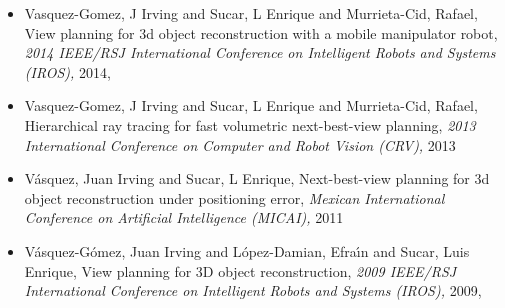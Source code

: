 \begin{itemize}
\item Vasquez-Gomez, J Irving and Sucar, L Enrique and Murrieta-Cid, Rafael, View planning for 3d object reconstruction with a mobile manipulator robot, \textit{ 2014 IEEE/RSJ International Conference on Intelligent Robots and Systems (IROS),} 2014, \href{https://doi.org/10.1109/IROS.2014.6943158} {\faFilePdfO} 
\item Vasquez-Gomez, J Irving and Sucar, L Enrique and Murrieta-Cid, Rafael, Hierarchical ray tracing for fast volumetric next-best-view planning, \textit{ 2013 International Conference on Computer and Robot Vision (CRV),} 2013 
\item V{\'a}squez, Juan Irving and Sucar, L Enrique, Next-best-view planning for 3d object reconstruction under positioning error, \textit{ Mexican International Conference on Artificial Intelligence (MICAI),} 2011 
\item V{\'a}squez-G{\'o}mez, Juan Irving and L{\'o}pez-Damian, Efra{\'\i}n and Sucar, Luis Enrique, View planning for 3D object reconstruction, \textit{ 2009 IEEE/RSJ International Conference on Intelligent Robots and Systems (IROS),} 2009, \href{https://doi.org/10.1109/IROS.2009.5354383} {\faFilePdfO} 
\end{itemize} 
